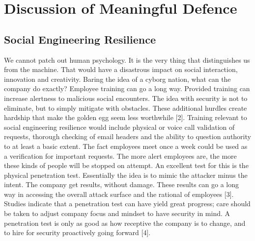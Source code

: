 \chapter {Discussion of Meaningful Defence}
\section {Social Engineering Resilience}
We cannot patch out human psychology. It is the very thing that distinguishes us from the machine. That would have a disastrous impact on social interaction, innovation and creativity. Baring the idea of a cyborg nation, what can the company do exactly? 
Employee training can go a long way. Provided training can increase alertness to malicious social encounters. The idea with security is not to eliminate, but to simply mitigate with obstacles. These additional hurdles create hardship that make the golden egg seem less worthwhile [2].
Training relevant to social engineering resilience would include physical or voice call validation of requests, thorough checking of email headers and the ability to question authority to at least a basic extent. The fact employees meet once a week could be used as a verification for important requests.
The more alert employees are, the more these kinds of people will be stopped on attempt. An excellent test for this is the physical penetration test. Essentially the idea is to mimic the attacker minus the intent. The company get results, without damage. These results can go a long way in accessing the overall attack surface and the rational of employees [3]. Studies indicate that a penetration test can have yield great progress; care should be taken to adjust company focus and mindset to have security in mind. A penetration test is only as good as how receptive the company is to change, and to hire for security proactively going forward [4].

